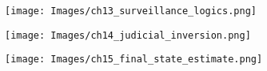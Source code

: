 \documentclass[12pt]{book}
\begin{document}

\texttt{[image: Images/ch13\_surveillance\_logics.png]}


\texttt{[image: Images/ch14\_judicial\_inversion.png]}


\texttt{[image: Images/ch15\_final\_state\_estimate.png]}

\appendix







\printbibliography
\end{document}

